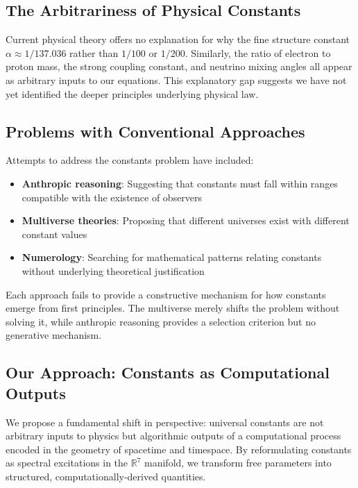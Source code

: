 \documentclass{article}
\begin{document}
\subsection{The Arbitrariness of Physical Constants}

Current physical theory offers no explanation for why the fine structure constant $\alpha \approx 1/137.036$ rather than $1/100$ or $1/200$. Similarly, the ratio of electron to proton mass, the strong coupling constant, and neutrino mixing angles all appear as arbitrary inputs to our equations. This explanatory gap suggests we have not yet identified the deeper principles underlying physical law.

\subsection{Problems with Conventional Approaches}

Attempts to address the constants problem have included:

\begin{itemize}
    \item \textbf{Anthropic reasoning}: Suggesting that constants must fall within ranges compatible with the existence of observers
    \item \textbf{Multiverse theories}: Proposing that different universes exist with different constant values
    \item \textbf{Numerology}: Searching for mathematical patterns relating constants without underlying theoretical justification
\end{itemize}

Each approach fails to provide a constructive mechanism for how constants emerge from first principles. The multiverse merely shifts the problem without solving it, while anthropic reasoning provides a selection criterion but no generative mechanism.

\subsection{Our Approach: Constants as Computational Outputs}

We propose a fundamental shift in perspective: universal constants are not arbitrary inputs to physics but algorithmic outputs of a computational process encoded in the geometry of spacetime and timespace. By reformulating constants as spectral excitations in the $\mathbb{R}^7$ manifold, we transform free parameters into structured, computationally-derived quantities.
\end{document}
